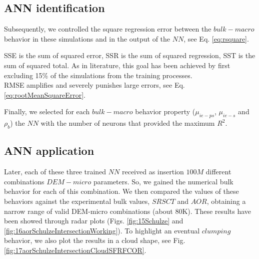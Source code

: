 % 

\subsection{ANN identification}
\label{subsec:annmodeliden}
Subsequently, we controlled the square regression error between the $bulk-macro$
behavior in these simulations and in the output of the $NN$, see Eq.
\ref{eq:rsquare}.

SSE is the sum of squared error, SSR is the sum of squared regression, SST is
the sum of squared total.
As in literature, this goal has been achieved by first excluding 15\% of the
simulations from the training processes.\\

RMSE amplifies and severely punishes large errors, see Eq.
\ref{eq:rootMeanSquareError}.



Finally, we selected for each $bulk-macro$ behavior property ($\mu_{ie-ps}$, $\mu_{ie-s}$ and $\rho_b$) the $NN$ with the 
number of neurons that provided the maximum $R^2$.


% 

\subsection{ANN application}
\label{subsec:annapplication}

Later, each of these three trained $NN$ received as insertion $100M$ different
combinations $DEM-micro$ parameters.
So, we gained the numerical bulk behavior for each of this combination. 
We then compared the values of these behaviors against the experimental bulk
values, $SRSCT$ and $AOR$, obtaining a narrow range of valid DEM-micro
combinations (about 80K).
These results have been showed through radar plots (Figs. \ref{fig:15Schulze}
and \ref{fig:16aorSchulzeIntersectionWorking}).
To highlight an eventual $clumping$ behavior, we also plot the results in a
cloud shape, see Fig. \ref{fig:17aorSchulzeIntersectionCloudSFRFCOR}.

%


% 

